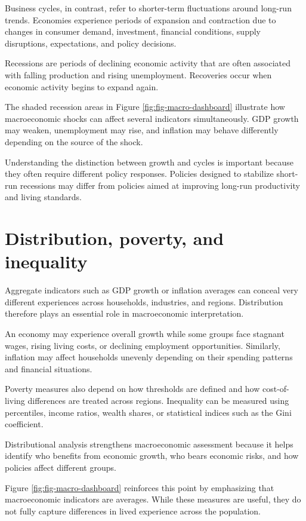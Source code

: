 \documentclass[
  11pt,
  oneside]{book}
\begin{document}
Business cycles, in contrast, refer to shorter-term fluctuations around long-run trends. Economies experience periods of expansion and contraction due to changes in consumer demand, investment, financial conditions, supply disruptions, expectations, and policy decisions.

Recessions are periods of declining economic activity that are often associated with falling production and rising unemployment. Recoveries occur when economic activity begins to expand again.

The shaded recession areas in Figure \ref{fig:fig-macro-dashboard} illustrate how macroeconomic shocks can affect several indicators simultaneously. GDP growth may weaken, unemployment may rise, and inflation may behave differently depending on the source of the shock.

Understanding the distinction between growth and cycles is important because they often require different policy responses. Policies designed to stabilize short-run recessions may differ from policies aimed at improving long-run productivity and living standards.

\section{Distribution, poverty, and inequality}\label{distribution-poverty-and-inequality}

Aggregate indicators such as GDP growth or inflation averages can conceal very different experiences across households, industries, and regions. Distribution therefore plays an essential role in macroeconomic interpretation.

An economy may experience overall growth while some groups face stagnant wages, rising living costs, or declining employment opportunities. Similarly, inflation may affect households unevenly depending on their spending patterns and financial situations.

Poverty measures also depend on how thresholds are defined and how cost-of-living differences are treated across regions. Inequality can be measured using percentiles, income ratios, wealth shares, or statistical indices such as the Gini coefficient.

Distributional analysis strengthens macroeconomic assessment because it helps identify who benefits from economic growth, who bears economic risks, and how policies affect different groups.

Figure \ref{fig:fig-macro-dashboard} reinforces this point by emphasizing that macroeconomic indicators are averages. While these measures are useful, they do not fully capture differences in lived experience across the population.
\end{document}

